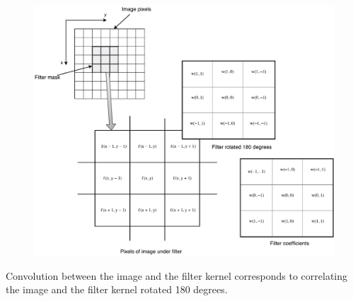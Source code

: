 \begin{figure}[H]
	\centering
	\includegraphics[width=\linewidth]{fig/digimageproc.pdf}
	\caption{}
	\label{fig:spatial_filter}
\end{figure}
Convolution between the image and the filter kernel corresponds to correlating the image and the filter kernel rotated 180 degrees.

